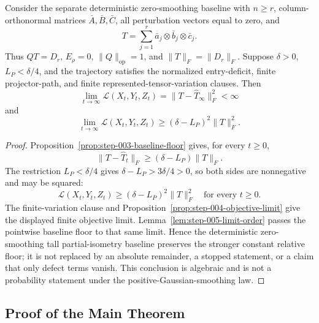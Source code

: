 \begin{proposition}
\label{prop:step-005-baseline-limit}
Consider the separate deterministic zero-smoothing baseline with $n\geq r$,
column-orthonormal matrices $\bar A,\bar B,\bar C$, all perturbation vectors
equal to zero, and
\[
T=\sum_{j=1}^r\bar a_j\otimes\bar b_j\otimes\bar c_j.
\]
Thus $QT=D_r$, $E_\rho=0$, $\|Q\|_{\mathrm{op}}=1$, and
$\|T\|_F=\|D_r\|_F$.  Suppose $\delta>0$, $L_P<\delta/4$, and the
trajectory satisfies the normalized entry-deficit, finite projector-path,
and finite represented-tensor-variation clauses.  Then
\[
\lim_{t\to\infty}\mathcal L(X_t,Y_t,Z_t)
=\|T-\widehat T_\infty\|_F^2<\infty
\]
and
\[
\lim_{t\to\infty}\mathcal L(X_t,Y_t,Z_t)
\geq(\delta-L_P)^2\|T\|_F^2.
\]
\end{proposition}

\begin{proof}
Proposition~\ref{prop:step-003-baseline-floor} gives, for every $t\geq0$,
\[
\|T-\widehat T_t\|_F\geq(\delta-L_P)\|T\|_F.
\]
The restriction $L_P<\delta/4$ gives
$\delta-L_P>3\delta/4>0$, so both sides are nonnegative and may be squared:
\[
\mathcal L(X_t,Y_t,Z_t)
\geq(\delta-L_P)^2\|T\|_F^2
\quad\text{for every }t\geq0.
\]
The finite-variation clause and
Proposition~\ref{prop:step-004-objective-limit} give the displayed finite
objective limit.  Lemma~\ref{lem:step-005-limit-order} passes the pointwise
baseline floor to that same limit.  Hence the deterministic zero-smoothing
tall partial-isometry baseline preserves the stronger constant relative
floor; it is not replaced by an absolute remainder, a stopped statement, or
a claim that only defect terms vanish.  This conclusion is algebraic and is
not a probability statement under the positive-Gaussian-smoothing law.
\end{proof}

\subsection{Proof of the Main Theorem}\label{app:main-proof}

